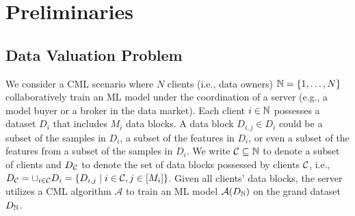 \section{Preliminaries}

\subsection{Data Valuation Problem}
We consider a CML scenario where $N$ clients (i.e., data owners) $\clientset=\set[1,\dots, N]$ collaboratively train an ML model under the coordination of a server (e.g., a model buyer or a broker in the data market).
Each client $i\in \clientset$ possesses a dataset $D_i$ that includes $M_i$ data blocks.
A data block $D_{i, j} \in D_i$ could be a subset of the samples in $D_i$, a subset of the features in $D_i$, or even a subset of the features from a subset of the samples in $D_i$.
We write $\clientsubset \subseteq \clientset$ to denote a subset of clients and $D_{\clientsubset}$ to denote the set of data blocks possessed by clients $\clientsubset$, i.e., $D_{\clientsubset} = \cup_{i \in \clientsubset} D_i = \{D_{i,j} \mid i\in \clientsubset, j\in[M_i]\}$.
Given all clients' data blocks, the server utilizes a CML algorithm $\mathcal{A}$ to train an ML model $\mathcal{A}(\granddataset)$ on the grand dataset $\granddataset$. 



